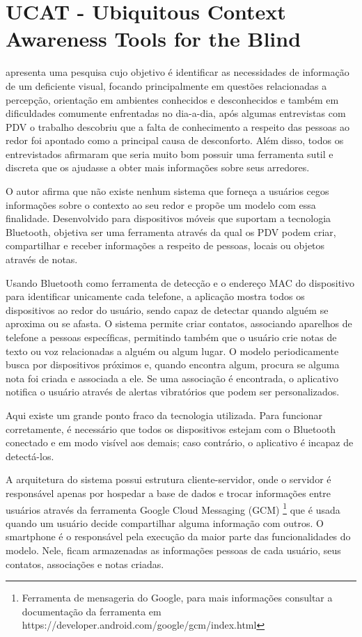 \documentclass[english,brazilian]{UNISINOSmonografia}
\begin{document}
	\section{UCAT - Ubiquitous Context Awareness Tools for the Blind}
 apresenta uma pesquisa cujo objetivo é identificar as necessidades de informação de um deficiente visual, focando principalmente em questões relacionadas a percepção, orientação em ambientes conhecidos e desconhecidos e também em dificuldades comumente enfrentadas no dia-a-dia, após algumas entrevistas com PDV o trabalho descobriu que a falta de conhecimento a respeito das pessoas ao redor foi apontado como a principal causa de desconforto. Além disso, todos os entrevistados afirmaram que seria muito bom possuir uma ferramenta sutil e discreta que os ajudasse a obter mais informações sobre seus arredores.

O autor afirma que não existe nenhum sistema que forneça a usuários cegos informações sobre o contexto ao seu redor e propõe um modelo com essa finalidade. Desenvolvido para dispositivos móveis que suportam a tecnologia Bluetooth, objetiva ser uma ferramenta através da qual os PDV podem criar, compartilhar e receber informações a respeito de pessoas, locais ou objetos através de notas. 

Usando Bluetooth como ferramenta de detecção e o endereço MAC do dispositivo para identificar unicamente cada telefone, a aplicação mostra todos os dispositivos ao redor do usuário, sendo capaz de detectar quando alguém se aproxima ou se afasta. O sistema permite criar contatos, associando aparelhos de telefone a pessoas específicas, permitindo também que o usuário crie notas de texto ou voz relacionadas a alguém ou algum lugar. O modelo periodicamente busca por dispositivos próximos e, quando encontra algum, procura se alguma nota foi criada e associada a ele. Se uma associação é encontrada, o aplicativo notifica o usuário através de alertas vibratórios que podem ser personalizados.

Aqui existe um grande ponto fraco da tecnologia utilizada. Para funcionar corretamente, é necessário que todos os dispositivos estejam com o Bluetooth conectado e em modo visível aos demais; caso contrário, o aplicativo é incapaz de detectá-los.

A arquitetura do sistema possui estrutura cliente-servidor, onde o servidor é responsável apenas por hospedar a base de dados e trocar informações entre usuários através da ferramenta Google Cloud Messaging (GCM) \footnote{Ferramenta de mensageria do Google, para mais informações consultar a documentação da ferramenta em https://developer.android.com/google/gcm/index.html} que é usada quando um usuário decide compartilhar alguma informação com outros. O smartphone é o responsável pela execução da maior parte das funcionalidades do modelo. Nele, ficam armazenadas as informações pessoas de cada usuário, seus contatos, associações e notas criadas.
\end{document}

